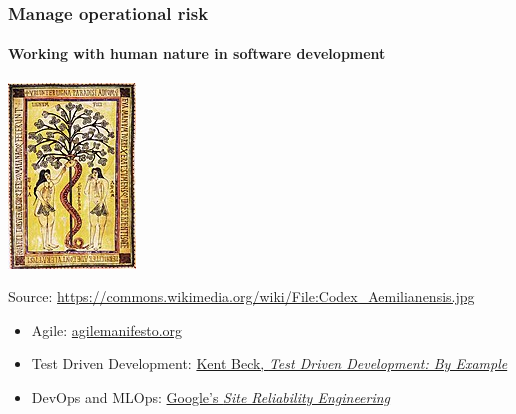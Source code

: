 \begin{frame}
    \frametitle{Manage operational risk}
    \framesubtitle{Working with human nature in software development}
    \begin{center}
        \includegraphics[height=0.35\textheight]{graphics/Codex_Aemilianensis}
        \end{center}
        Source: \url{https://commons.wikimedia.org/wiki/File:Codex_Aemilianensis.jpg}
    \begin{itemize}
    \item Agile: \href{https://agilemanifesto.org/}{agilemanifesto.org}
    \item Test Driven Development: \href{https://www.oreilly.com/library/view/test-driven-development/0321146530/}{Kent Beck, {\it Test Driven Development: By Example}}
    \item DevOps and MLOps: \href{https://landing.google.com/sre/books/}{Google's {\it Site Reliability Engineering}}
    \end{itemize}
\end{frame}

